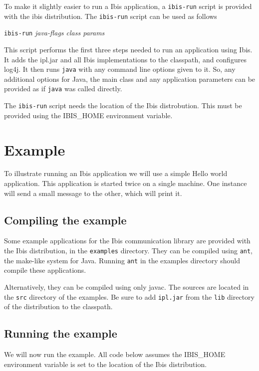 \documentclass[10pt]{article}
\begin{document}
To make it slightly easier to run a Ibis application, a
\texttt{ibis-run} script is provided with the ibis distribution. The
\texttt{ibis-run} script can be used as follows

\begin{center}
\texttt{ibis-run} \emph{java-flags class params}
\end{center}

This script performs the first three steps needed to run an application
using Ibis. It adds the ipl.jar and all Ibis implementations to the
classpath, and configures log4j. It then runs \texttt{java} with any
command line options given to it. So, any additional options for Java,
the main class and any application parameters can be provided as if
\texttt{java} was called directly.

The \texttt{ibis-run} script needs the location of the Ibis
distrobution. This must be provided using the IBIS\_HOME environment
variable.

\section{Example}

To illustrate running an Ibis application we will use a simple Hello
world application. This application is started twice on a single
machine. One instance will send a small message to the other, which will
print it.

\subsection{Compiling the example}

Some example applications for the Ibis communication library are
provided with the Ibis distribution, in the \texttt{examples} directory.
They can be compiled using \texttt{ant}, the make-like system for Java.
Running \texttt{ant} in the examples directory should compile these
applications. 

Alternatively, they can be compiled using only javac. The sources are
located in the \texttt{src} directory of the examples. Be sure to add
\texttt{ipl.jar} from the \texttt{lib} directory of the distribution to
the classpath.

\subsection{Running the example}

We will now run the example. All code below assumes the IBIS\_HOME
environment variable is set to the location of the Ibis distribution.
\end{document}
